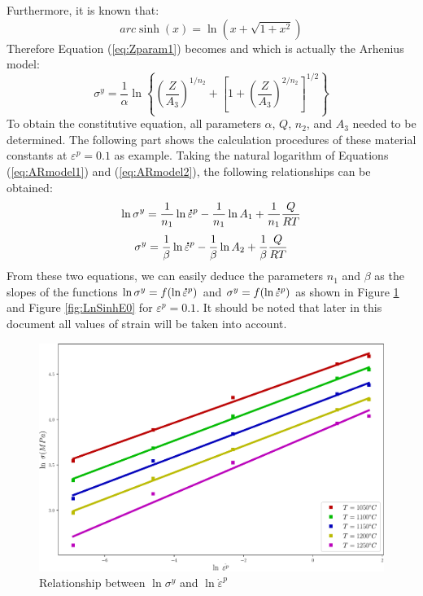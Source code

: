 \documentclass[twoside,english,1p,final,sort&compress]{elsarticle}
\theoremstyle{plain}
\newcommand{\mdot}[1]{\accentset{\mbox{\bfseries .}}{#1}}
\begin{document}
Furthermore, it is known that:
\begin{equation}
arc\sinh(x) = \ln\left(x + \sqrt{1+x^2}\right)
\end{equation}
Therefore Equation (\ref{eq:Zparam1}) becomes and which is actually the Arhenius model:
\begin{equation}
\sigma^y = \frac{1}{\alpha}\ln\left\{\left(\frac{Z}{A_3}\right)^{1/n_2} + \left[1 + \left(\frac{Z}{A_3}\right)^{2/n_2}\right]^{1/2}\right\}
\end{equation}
To obtain the constitutive equation, all parameters $\alpha$, $Q$, $n_2$, and $A_3$ needed to be determined. The following part shows the calculation procedures of these material constants at $\varepsilon^p = 0.1$ as example. Taking the natural logarithm of Equations (\ref{eq:ARmodel1}) and (\ref{eq:ARmodel2}), the following relationships can be obtained:
\begin{equation}
\ln \sigma^y = \frac{1}{n_1}\ln \mdot{\varepsilon}^p -\frac{1}{n_1}\ln A_1 +  \frac{1}{n_1}\frac{Q}{RT}
\end{equation}
\begin{equation}
\sigma^y = \frac{1}{\beta}\ln \mdot{\varepsilon}^p - \frac{1}{\beta}\ln A_2 + \frac{1}{\beta}\frac{Q}{RT}
\end{equation}
From these two equations, we can easily deduce the parameters $n_1$ and $\beta$ as the slopes of the functions $\ln\sigma^y = f(\ln\mdot{\varepsilon}^p)$  and $\sigma^y = f(\ln\mdot{\varepsilon}^p)$ as shown in Figure \ref{fig:LnAlp} and Figure \ref{fig:LnSinhE0} for $\varepsilon^p = 0.1$. It should be noted that later in this document all values of strain will be taken into account.
\begin{figure}[!ht]
\centering
\includegraphics[width=0.9\columnwidth]{Figures/LnAlp}
\caption{Relationship between $\ln \sigma^y$ and $\ln \dot{\varepsilon}^p$}
\label{fig:LnAlp}
\end{figure}
\end{document}
